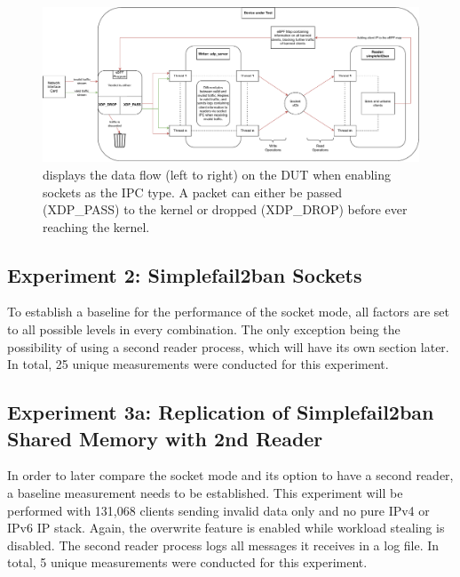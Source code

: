 \begin{figure}[h!]
    \centerline{\includegraphics[width=1.2\textwidth]{images/MeasurementArchitecture.pdf}}
    \caption[\ac{DUT} during socket measurements]{
        displays the data flow (left to right) on the \ac{DUT} when enabling sockets as the \ac{IPC} type.
        A packet can either be passed (XDP\_PASS) to the kernel or dropped (XDP\_DROP) before ever reaching the kernel.}
	\label{fig:socket:measurement}
\end{figure}


\subsection{Experiment 2: Simplefail2ban Sockets}
To establish a baseline for the performance of the socket mode, all factors are set to all possible levels in every combination.
The only exception being the possibility of using a second reader process, which will have its own section later.
In total, 25 unique measurements were conducted for this experiment.

\subsection{Experiment 3a: Replication of Simplefail2ban Shared Memory with 2nd Reader}
In order to later compare the socket mode and its option to have a second reader, a baseline measurement needs to be established.
This experiment will be performed with 131,068 clients sending invalid data only and no pure IPv4 or IPv6 \ac{IP} stack.
Again, the overwrite feature is enabled while workload stealing is disabled.
The second reader process logs all messages it receives in a log file.
In total, 5 unique measurements were conducted for this experiment.

